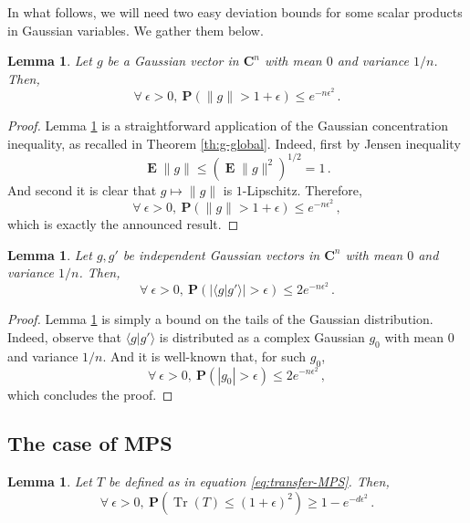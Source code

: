 \documentclass{amsart}
\newtheorem{lemma}[theorem]{Lemma}
\newcommand{\C}{\mathbf{C}}
\renewcommand{\P}{\mathbf{P}}
\renewcommand{\leq}{\leqslant}
\renewcommand{\geq}{\geqslant}
\DeclareMathOperator{\Tr}{Tr}
\DeclareMathOperator{\E}{\mathbf{E}}
\newcommand{\braket}[2]{\langle #1 | #2\rangle}
\begin{document}
In what follows, we will need two easy deviation bounds for some scalar products in Gaussian variables. We gather them below.

\begin{lemma} \label{lem:gg}
    Let $g$ be a Gaussian vector in $\C^n$ with mean $0$ and variance $1/n$. Then,
    \[ \forall\ \epsilon>0,\ \P\left( \|g\| > 1+\epsilon \right) \leq e^{-n\epsilon^2} \, . \]
\end{lemma}

\begin{proof}
    Lemma \ref{lem:gg} is a straightforward application of the Gaussian concentration inequality, as recalled in Theorem \ref{th:g-global}. Indeed, first by Jensen inequality
    \[ \E\|g\| \leq \left(\E\|g\|^2\right)^{1/2} =1 \, . \]
    And second it is clear that $g\mapsto\|g\|$ is $1$-Lipschitz. Therefore,
    \[ \forall\ \epsilon>0,\ \P\left( \|g\| > 1+\epsilon \right) \leq e^{-n\epsilon^2} \, , \]
    which is exactly the announced result.
\end{proof}

\begin{lemma} \label{lem:gg'}
    Let $g,g'$ be independent Gaussian vectors in $\C^n$ with mean $0$ and variance $1/n$. Then,
    \[ \forall\ \epsilon>0,\ \P\left( |\braket{g}{g'}| > \epsilon \right) \leq 2e^{-n\epsilon^2} \, . \]
\end{lemma}

\begin{proof}
    Lemma \ref{lem:gg'} is simply a bound on the tails of the Gaussian distribution. Indeed, observe that $\braket{g}{g'}$ is distributed as a complex Gaussian $g_0$ with mean $0$ and variance $1/n$. And it is well-known that, for such $g_0$,
    \[ \forall\ \epsilon>0,\ \P\left( |g_0| > \epsilon \right) \leq 2e^{-n\epsilon^2} \, , \]
    which concludes the proof.
\end{proof}

\subsection{The case of MPS} \hfill\par\smallskip
\label{sec:decay-correlations-2-MPS}

\begin{lemma} \label{lem:trace-T}
    Let $T$ be defined as in equation \eqref{eq:transfer-MPS}. Then,
    \[ \forall\ \epsilon>0,\ \P\left( \Tr (T) \leq (1+\epsilon)^2 \right) \geq 1-e^{-d\epsilon^2} \, . \]
\end{lemma}
\end{document}
